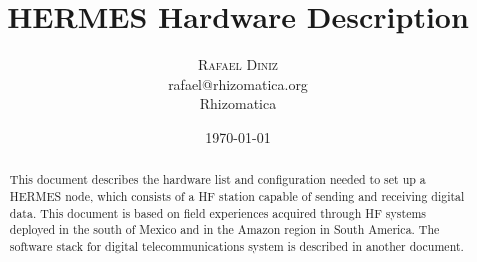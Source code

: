 \documentclass[11pt,a4paper]{article}
\title{HERMES Hardware Description}
\author{
       \large
        \textsc{Rafael Diniz}
        \mbox{}\\ %
        rafael@rhizomatica.org\\
        \mbox{Rhizomatica} \\ %
}
\date{\today}
\begin{document}
\maketitle

\begin{abstract}
This document describes the hardware list and configuration needed to set up
a HERMES node, which consists of a HF station capable
of sending and receiving digital data. This document is based on field
experiences acquired through HF systems deployed in the south of Mexico
and in the Amazon region in South America. The software stack for digital
telecommunications system is described in another document.
\end{abstract}

\newpage

\tableofcontents


\end{document}
